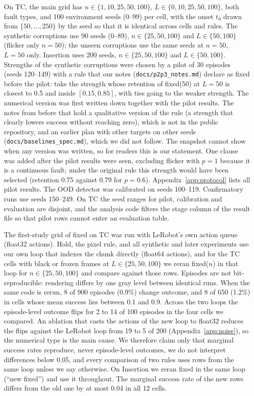 \documentclass[11pt]{article}
\newcommand{\fixed}{\textsf{fixed}\xspace}
\begin{document}
On TC, the main grid has $n\in\{1,10,25,50,100\}$, $L\in\{0,10,25,50,100\}$, both fault types, and 100 environment seeds (0--99) per cell, with the onset $t_0$ drawn from $\{50,\dots,250\}$ by the seed so that it is identical across cells and rules. The synthetic corruptions use 90 seeds (0--89), $n\in\{25,50,100\}$ and $L\in\{50,100\}$ (flicker only $n{=}50$); the unseen corruptions use the same seeds at $n{=}50$, $L{=}50$ only. Insertion uses 200 seeds, $n\in\{25,50,100\}$ and $L\in\{50,100\}$. Strengths of the synthetic corruptions were chosen by a pilot of 30 episodes (seeds 120--149) with a rule that our notes (\texttt{docs/p2p3\_notes.md}) declare as fixed before the pilot: take the strength whose retention of \fixed(50) at $L{=}50$ is closest to 0.5 and inside $[0.15,0.85]$, with ties going to the weaker strength. The numerical version was first written down together with the pilot results. The notes from before that hold a qualitative version of the rule (a strength that clearly lowers success without reaching zero), which is not in the public repository, and an earlier plan with other targets on other seeds (\texttt{docs/baselines\_spec.md}), which we did not follow. The snapshot cannot show when any version was written, so for readers this is our statement. One clause was added after the pilot results were seen, excluding flicker with $p{=}1$ because it is a continuous fault; under the original rule this strength would have been selected (retention 0.75 against 0.79 for $p{=}0.6$). Appendix~\ref{app:protocol} lists all pilot results. The OOD detector was calibrated on seeds 100--119. Confirmatory runs use seeds 150--249. On TC the seed ranges for pilot, calibration and evaluation are disjoint, and the analysis code filters the stage column of the result file so that pilot rows cannot enter an evaluation table.

The first-study grid of \fixed on TC was run with LeRobot's own action queue (float32 actions). Hold, the pixel rule, and all synthetic and later experiments use our own loop that indexes the chunk directly (float64 actions), and for the TC cells with black or frozen frames at $L\in\{25,50,100\}$ we reran \fixed($n$) in that loop for $n\in\{25,50,100\}$ and compare against those rows. Episodes are not bit-reproducible: rendering differs by one gray level between identical runs. When the same code is rerun, 8 of 900 episodes (0.9\%) change outcome, and 8 of 650 (1.2\%) in cells whose mean success lies between 0.1 and 0.9. Across the two loops the episode-level outcome flips for 2 to 14 of 100 episodes in the four cells we compared. An ablation that casts the actions of the new loop to float32 reduces the flips against the LeRobot loop from 19 to 5 of 200 (Appendix~\ref{app:noise}), so the numerical type is the main cause. We therefore claim only that marginal success rates reproduce, never episode-level outcomes, we do not interpret differences below 0.05, and every comparison of two rules uses rows from the same loop unless we say otherwise. On Insertion we reran \fixed in the same loop (``new \fixed'') and use it throughout. The marginal success rate of the new rows differs from the old one by at most 0.04 in all 12 cells.
\end{document}
